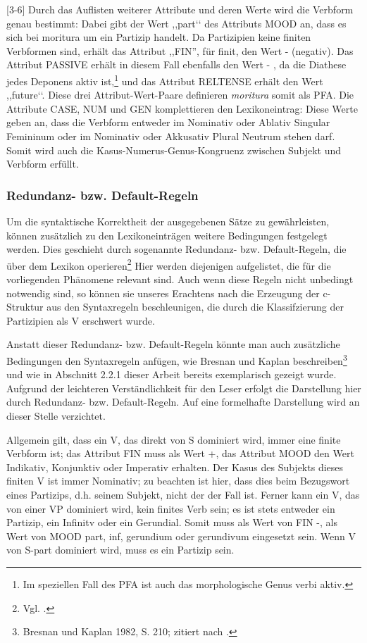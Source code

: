\documentclass[12pt,a4paper]{article}
\begin{document}
[3-6] Durch das Auflisten weiterer Attribute und deren Werte wird die Verbform genau bestimmt: Dabei gibt der Wert ,,part‘‘ des Attributs MOOD an, dass es sich bei moritura um ein Partizip handelt. Da Partizipien keine finiten Verbformen sind, erhält das Attribut ,,FIN'', für finit, den Wert - (negativ). Das Attribut PASSIVE erhält in diesem Fall ebenfalls den Wert - , da die Diathese jedes Deponens aktiv ist,\footnote{Im speziellen Fall des PFA ist auch das morphologische Genus verbi aktiv.} und das Attribut RELTENSE erhält den Wert ,,future‘‘. Diese drei Attribut-Wert-Paare definieren \textit{moritura} somit als PFA. Die Attribute CASE, NUM und GEN komplettieren den Lexikoneintrag: Diese Werte geben an, dass die Verbform entweder im Nominativ oder Ablativ Singular Femininum oder im Nominativ oder Akkusativ Plural Neutrum stehen darf. Somit wird auch die Kasus-Numerus-Genus-Kongruenz zwischen Subjekt und Verbform erfüllt.

\subsubsection{Redundanz- bzw. Default-Regeln}
Um die syntaktische Korrektheit der ausgegebenen Sätze zu gewährleisten, können zusätzlich zu den Lexikoneinträgen weitere Bedingungen festgelegt werden. Dies geschieht durch sogenannte Redundanz- bzw. Default-Regeln, die über dem Lexikon operieren\footnote{Vgl. \cite[23-4]{Rohrer}.} Hier werden diejenigen aufgelistet, die für die vorliegenden Phänomene relevant sind. Auch wenn diese Regeln nicht unbedingt notwendig sind, so können sie unseres Erachtens nach die Erzeugung der c-Struktur aus den Syntaxregeln beschleunigen, die durch die Klassifzierung der Partizipien als V erschwert
wurde.

Anstatt dieser Redundanz- bzw. Default-Regeln könnte man auch zusätzliche Bedingungen den Syntaxregeln anfügen, wie Bresnan und Kaplan beschreiben\footnote{Bresnan und Kaplan 1982, S. 210; zitiert nach \cite[54]{Rohrer}.} und wie in Abschnitt 2.2.1 dieser Arbeit bereits exemplarisch gezeigt wurde. Aufgrund der leichteren Verständlichkeit für den Leser erfolgt die Darstellung hier durch Redundanz- bzw. Default-Regeln. Auf eine formelhafte Darstellung wird an dieser Stelle verzichtet.

Allgemein gilt, dass ein V, das direkt von S dominiert wird, immer eine
finite Verbform ist; das Attribut FIN muss als Wert +, das Attribut MOOD den Wert Indikativ, Konjunktiv oder Imperativ erhalten.
Der Kasus des Subjekts dieses finiten V ist immer Nominativ; zu beachten ist hier, dass dies beim Bezugswort eines Partizips, d.h. seinem Subjekt, nicht der der Fall ist.
Ferner kann ein V, das von einer VP dominiert wird, kein finites Verb sein; es ist stets entweder ein Partizip, ein Infinitv oder ein Gerundial. Somit muss als Wert von FIN -, als Wert von MOOD part, inf, gerundium  oder gerundivum eingesetzt sein.
Wenn V von S-part dominiert wird, muss es ein Partizip sein.
\end{document}
